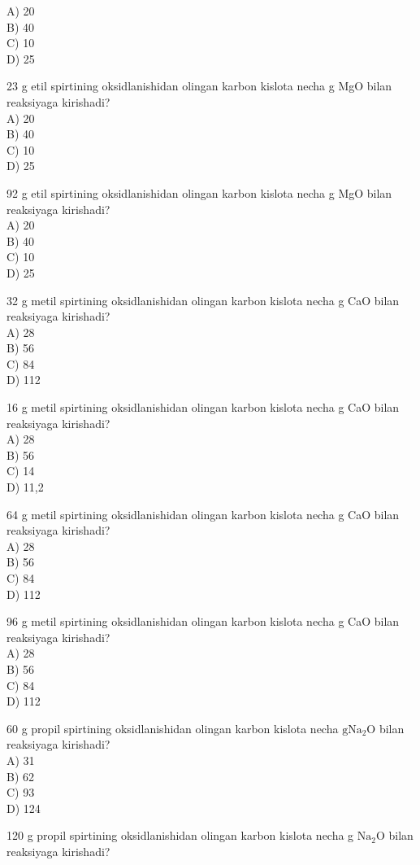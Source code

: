 A) 20\\
B) 40\\
C) 10\\
D) 25
  \item 23 g etil spirtining oksidlanishidan olingan karbon kislota necha g MgO bilan reaksiyaga kirishadi?\\
A) 20\\
B) 40\\
C) 10\\
D) 25
  \item 92 g etil spirtining oksidlanishidan olingan karbon kislota necha g MgO bilan reaksiyaga kirishadi?\\
A) 20\\
B) 40\\
C) 10\\
D) 25
  \item 32 g metil spirtining oksidlanishidan olingan karbon kislota necha g CaO bilan reaksiyaga kirishadi?\\
A) 28\\
B) 56\\
C) 84\\
D) 112
  \item 16 g metil spirtining oksidlanishidan olingan karbon kislota necha g CaO bilan reaksiyaga kirishadi?\\
A) 28\\
B) 56\\
C) 14\\
D) 11,2
  \item 64 g metil spirtining oksidlanishidan olingan karbon kislota necha g CaO bilan reaksiyaga kirishadi?\\
A) 28\\
B) 56\\
C) 84\\
D) 112
  \item 96 g metil spirtining oksidlanishidan olingan karbon kislota necha g CaO bilan reaksiyaga kirishadi?\\
A) 28\\
B) 56\\
C) 84\\
D) 112
  \item 60 g propil spirtining oksidlanishidan olingan karbon kislota necha $\mathrm{g} \mathrm{Na}_{2} \mathrm{O}$ bilan reaksiyaga kirishadi?\\
A) 31\\
B) 62\\
C) 93\\
D) 124
  \item 120 g propil spirtining oksidlanishidan olingan karbon kislota necha g $\mathrm{Na}_{2} \mathrm{O}$ bilan reaksiyaga kirishadi?\\
